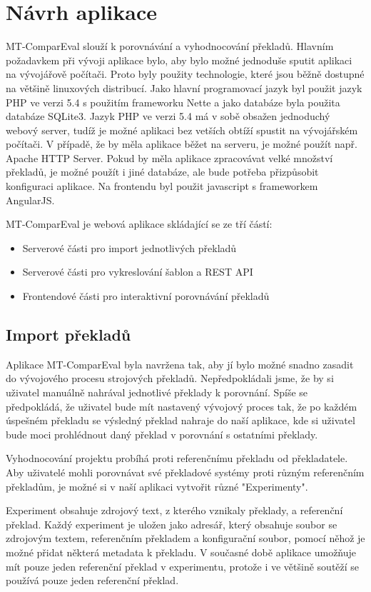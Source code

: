 \chapter{Návrh aplikace}
MT-ComparEval slouží k porovnávání a vyhodnocování překladů.
Hlavním požadavkem při vývoji aplikace bylo,
  aby bylo možné jednoduše sputit aplikaci na vývojářově počítači.
Proto byly použity technologie,
  které jsou běžně dostupné na většině linuxových distribucí.
Jako hlavní programovací jazyk byl použit jazyk PHP ve verzi 5.4 
  s použitím frameworku Nette
  a jako databáze byla použita databáze SQLite3.
Jazyk PHP ve verzi 5.4 má v sobě obsažen jednoduchý webový server,
  tudíž je možné aplikaci bez vetších obtíží spustit na vývojářském počítači.
V případě, že by měla aplikace běžet na serveru,
  je možné použít např. Apache HTTP Server.
Pokud by měla aplikace zpracovávat velké množství překladů,
  je možné použít i jiné databáze,
  ale bude potřeba přizpůsobit konfiguraci aplikace.
Na frontendu byl použit javascript s frameworkem AngularJS.


MT-ComparEval je webová aplikace skládající se ze tří částí:

\begin{itemize}
	\item Serverové části pro import jednotlivých překladů
	\item Serverové části pro vykreslování šablon a REST API
	\item Frontendové části pro interaktivní porovnávání překladů
\end{itemize}

\section{Import překladů}
Aplikace MT-ComparEval byla navržena tak,
  aby jí bylo možné snadno zasadit do vývojového procesu strojových překladů.
Nepředpokládali jsme,
  že by si uživatel manuálně nahrával jednotlivé překlady k porovnání.
Spíše se předpokládá, že uživatel bude mít nastavený vývojový proces tak,
  že po každém úspešném překladu se výsledný překlad nahraje do naší aplikace,
  kde si uživatel bude moci prohlédnout daný překlad v porovnání s ostatními překlady.


Vyhodnocování projektu probíhá proti referenčnímu překladu od překladatele.
Aby uživatelé mohli porovnávat své překladové systémy proti různým referenčním překladům,
  je možné si v naší aplikaci vytvořit různé "Experimenty". 

Experiment obsahuje zdrojový text, z kterého vznikaly překlady, a referenční překlad.
Každý experiment je uložen jako adresář,
  který obsahuje soubor se zdrojovým textem, referenčním překladem
  a konfigurační soubor, pomocí něhož je možné přidat některá metadata k překladu.
V současné době aplikace umožňuje mít pouze jeden referenční překlad v experimentu,
  protože i ve většině soutěží se používá pouze jeden referenční překlad.

